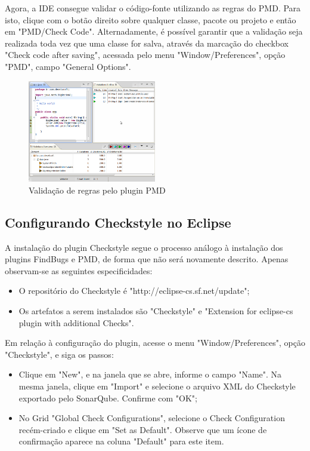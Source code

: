 \documentclass[12pt,journal,compsoc]{IEEEtran}
\begin{document}
Agora, a IDE consegue validar o código-fonte utilizando as regras do PMD. Para isto, clique com o botão direito sobre qualquer classe, pacote ou projeto e então em "PMD/Check Code". Alternadamente, é possível garantir que a validação seja realizada toda vez que uma classe for salva, através da marcação do checkbox "Check code after saving", acessada pelo menu "Window/Preferences", opção "PMD", campo "General Options".

\begin{figure}[ht!]
\centering
\includegraphics[width=0.5\textwidth]{img/eclipse-pmd-02}
\caption{Validação de regras pelo plugin PMD}
\label{eclipse-pmd-02}
\end{figure}

 
\subsection{Configurando Checkstyle no Eclipse}

A instalação do plugin Checkstyle\cite{checkstyle_eclipse_plugin} segue o processo análogo à instalação dos plugins FindBugs e PMD, de forma que não será novamente descrito. Apenas observam-se as seguintes especificidades:

\begin{itemize}
\item O repositório do Checkstyle é "http://eclipse-cs.sf.net/update";
\item Os artefatos a serem instalados são "Checkstyle" e "Extension for eclipse-cs plugin with additional Checks".
\end{itemize}
  
Em relação à configuração do plugin, acesse o menu "Window/Preferences", opção "Checkstyle", e siga os passos:

\begin{itemize}
\item Clique em "New", e na janela que se abre, informe o campo "Name". Na mesma janela, clique em "Import" e selecione o arquivo XML do Checkstyle exportado pelo SonarQube. Confirme com "OK"; 
\item No Grid "Global Check Configurations", selecione o Check Configuration recém-criado e clique em "Set as Default". Observe que um ícone de confirmação aparece na coluna "Default" para este item.
\end{itemize}
\end{document}
